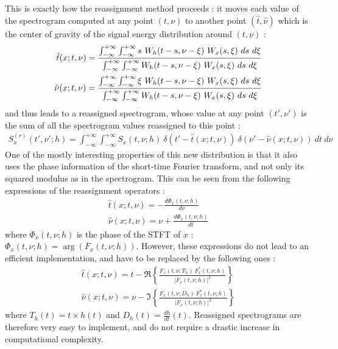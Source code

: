   This is exactly how the reassignment method proceeds : it moves each
value of the spectrogram computed at any point $(t,\nu)$ to another point
$(\hat{t},\hat{\nu})$ which is the center of gravity of the signal energy
distribution around $(t,\nu)$ :
\begin{eqnarray}
\label{hatt}
\hat{t}(x;t,\nu)={
\int_{-\infty}^{+\infty}\int_{-\infty}^{+\infty} s\ 
W_h(t-s,\nu-\xi)\ W_x(s,\xi)\ ds\ d\xi
\over
\int_{-\infty}^{+\infty}\int_{-\infty}^{+\infty} W_h(t-s,\nu-\xi)\
W_x(s,\xi)\ ds\ d\xi}\\ 
\label{hatnu}
\hat{\nu}(x;t,\nu)=\frac{\int_{-\infty}^{+\infty}\int_{-\infty}^{+\infty}
\xi\ W_h(t-s,\nu-\xi)\ W_x(s,\xi)\ ds\ d\xi} 
 {\int_{-\infty}^{+\infty}\int_{-\infty}^{+\infty} W_h(t-s,\nu-\xi)\
W_x(s,\xi)\ ds\ d\xi}	         
\end{eqnarray}
and thus leads to a reassigned spectrogram, whose value at any point
$(t',\nu')$ is the sum of all the spectrogram values reassigned to this
point :
\begin{eqnarray}
\label{reasspectro}
 S_x^{(r)}(t',\nu';h)=\int_{-\infty}^{+\infty}\int_{-\infty}^{+\infty}
S_x(t,\nu;h)\ \delta(t'-\hat{t}(x;t,\nu))\ \delta(\nu'-\hat{\nu}(x;t,\nu))\
dt\ d\nu \ \  
\end{eqnarray}
One of the mostly interesting properties of this new
distribution is that it also uses the phase information of the
short-time Fourier transform, and not only its squared modulus as in
the spectrogram. This can be seen from the following expressions of
the reassignment operators : 
\begin{eqnarray*}
	\hat{t}(x;t,\nu)  = -\frac{d\Phi_x(t,\nu;h)}{d\nu}\\
	\hat{\nu}(x;t,\nu) = \nu+\frac{d\Phi_x(t,\nu;h)}{dt}
\end{eqnarray*}
where $\Phi_x(t,\nu;h)$ is the phase of the STFT of $x$ :
$\Phi_x(t,\nu;h)=\arg(F_x(t,\nu;h))$. However, these expressions do not
lead to an efficient implementation, and have to be replaced by the
following ones :
\begin{eqnarray*}
\hat{t}(x;t,\nu)=t-\Re\left\{\frac{F_x(t,\nu;T_h)\
 F_x^*(t,\nu;h)}{|F_x(t,\nu;h)|^2}\right\}\\ 
\hat{\nu}(x;t,\nu)=\nu-\Im\left\{\frac{F_x(t,\nu;D_h)\
 F_x^*(t,\nu;h)}{|F_x(t,\nu;h)|^2}\right\} 
\end{eqnarray*}
where $T_h(t)=t\times h(t)$ and $D_h(t)=\frac{dh}{dt}(t)$. Reassigned
spectrograms are therefore very easy to implement, and do not require a
drastic increase in computational complexity.

